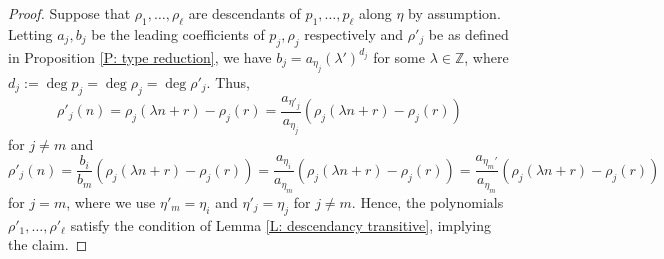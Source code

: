 \documentclass[11pt]{amsart}
\theoremstyle{definition}
\newcommand{\Z}{{\mathbb Z}}
\begin{document}
\begin{proof}
Suppose that $\rho_1, \ldots, \rho_\ell$ are descendants of $p_1, \ldots, p_\ell$ along $\eta$ by assumption.
Letting $a_j, b_j$ be the leading coefficients of $p_j, \rho_j$ respectively and $\rho'_j$ be as defined in Proposition \ref{P: type reduction}, we have $b_j = a_{\eta_j} (\lambda')^{d_j}$ for some $\lambda\in \Z$, where $d_j := \deg p_j = \deg \rho_j = \deg \rho'_j$. Thus,  $$\rho'_j(n) = \rho_j(\lambda n + r) - \rho_j(r) =\frac{a_{\eta'_j}}{a_{\eta_j}}(\rho_j(\lambda n + r) - \rho_j(r))$$ for $j\neq m$ and $$\rho'_j(n) = \frac{b_i}{b_m}(\rho_j(\lambda n + r) - \rho_j(r)) = \frac{a_{\eta_i}}{a_{\eta_m}}(\rho_j(\lambda n + r) - \rho_j(r)) = \frac{a_{\eta_m'}}{a_{\eta_m}}(\rho_j(\lambda n + r) - \rho_j(r))$$ for $j = m$, where we use $\eta'_m = \eta_i$ and $\eta'_j = \eta_j$ for $j\neq m$. Hence, the polynomials $\rho'_1, \ldots, \rho'_\ell$ satisfy the condition of Lemma \ref{L: descendancy transitive}, implying the claim.
\end{proof}
\end{document}
